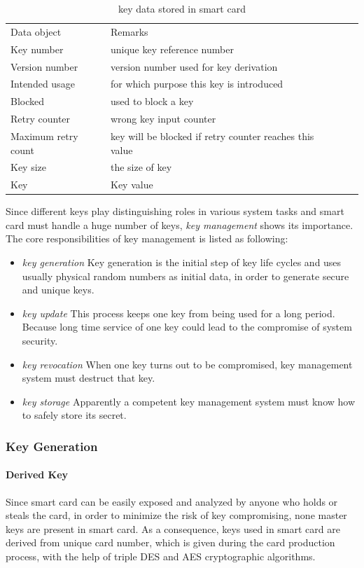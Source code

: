 \begin{table}[!htbp]
\caption{key data stored in smart card\cite{handbook}}
\begin{tabular}{lllll}
\hline\hline
Data object & Remarks\\[0.5ex]
Key number & unique key reference number\\
Version number & version number used for key derivation\\
Intended usage & for which purpose this key is introduced\\
Blocked & used to block a key\\
Retry counter & wrong key input counter\\
Maximum retry count & key will be blocked if retry counter reaches this value\\
Key size & the size of key\\
Key & Key value\\
\hline
\end{tabular}
\label{table:smart-card-key}
\end{table}

Since different keys play distinguishing roles in various system tasks and smart card must handle a huge number of keys, \emph{key management} shows its importance. The core responsibilities of key management is listed as following\cite{handbook}:
\begin{itemize}
\item \emph{key generation} Key generation is the initial step of key life cycles and uses usually physical random numbers as initial data, in order to generate secure and unique keys. 
\item \emph{key update} This process keeps one key from being used for a long period. Because long time service of one key could lead to the compromise of system security.
\item \emph{key revocation} When one key turns out to be compromised, key management system must destruct that key.
\item \emph{key storage} Apparently a competent key management system must know how to safely store its secret.
\end{itemize}
\subsubsection{Key Generation}
\paragraph{Derived Key}
Since smart card can be easily exposed and analyzed by anyone who holds or steals the card, in order to minimize the risk of key compromising, none master keys are present in smart card. As a consequence, keys used in smart card are derived from unique card number, which is given during the card production process, with the help of triple DES and AES cryptographic algorithms\cite{handbook}.
